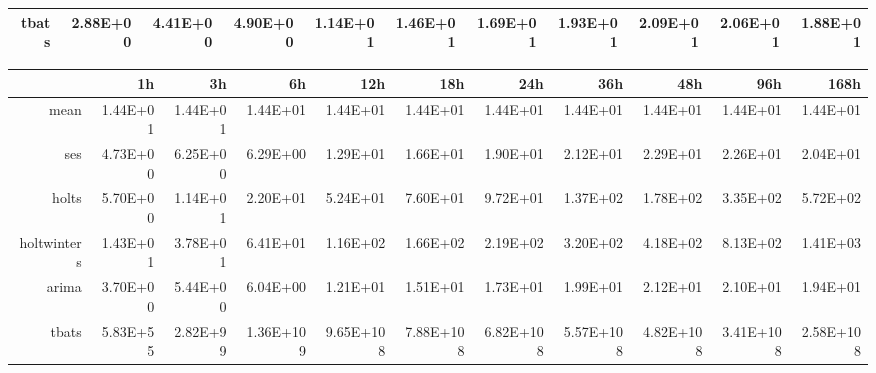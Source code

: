 \begin{landscape}
\begin{table}[ht]
\begin{tabular}{rrrrrrrrrrr}
  tbats & 2.88E+00 & 4.41E+00 & 4.90E+00 & 1.14E+01 & 1.46E+01 & 1.69E+01 & 1.93E+01 & 2.09E+01 & 2.06E+01 & 1.88E+01 \\ 
   \hline
\end{tabular}
\end{table}
\begin{table}[ht]
\centering
\begin{tabular}{rrrrrrrrrrr}
  \hline
 & 1h & 3h & 6h & 12h & 18h & 24h & 36h & 48h & 96h & 168h \\ 
  \hline
mean & 1.44E+01 & 1.44E+01 & 1.44E+01 & 1.44E+01 & 1.44E+01 & 1.44E+01 & 1.44E+01 & 1.44E+01 & 1.44E+01 & 1.44E+01 \\ 
  ses & 4.73E+00 & 6.25E+00 & 6.29E+00 & 1.29E+01 & 1.66E+01 & 1.90E+01 & 2.12E+01 & 2.29E+01 & 2.26E+01 & 2.04E+01 \\ 
  holts & 5.70E+00 & 1.14E+01 & 2.20E+01 & 5.24E+01 & 7.60E+01 & 9.72E+01 & 1.37E+02 & 1.78E+02 & 3.35E+02 & 5.72E+02 \\ 
  holtwinters & 1.43E+01 & 3.78E+01 & 6.41E+01 & 1.16E+02 & 1.66E+02 & 2.19E+02 & 3.20E+02 & 4.18E+02 & 8.13E+02 & 1.41E+03 \\ 
  arima & 3.70E+00 & 5.44E+00 & 6.04E+00 & 1.21E+01 & 1.51E+01 & 1.73E+01 & 1.99E+01 & 2.12E+01 & 2.10E+01 & 1.94E+01 \\ 
  tbats & 5.83E+55 & 2.82E+99 & 1.36E+109 & 9.65E+108 & 7.88E+108 & 6.82E+108 & 5.57E+108 & 4.82E+108 & 3.41E+108 & 2.58E+108 \\ 
   \hline
\end{tabular}
\end{table}

\end{landscape}








